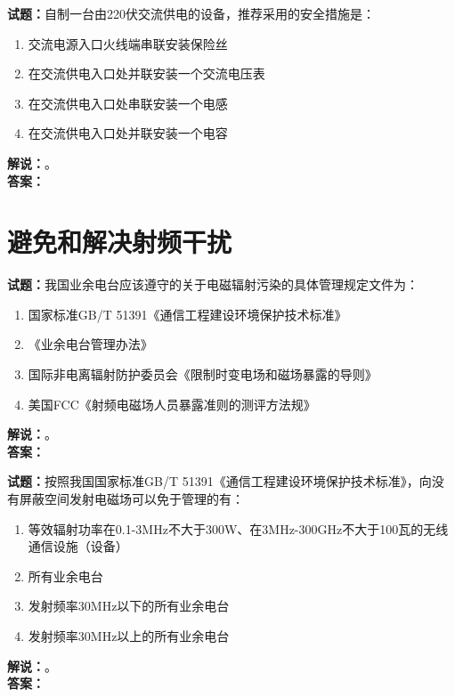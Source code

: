 \documentclass{ctexbook}
\begin{document}
\bigskip

\noindent\textbf{试题：}自制一台由220伏交流供电的设备，推荐采用的安全措施是：
\begin{enumerate}[leftmargin=3em]
  \item 交流电源入口火线端串联安装保险丝
  \item 在交流供电入口处并联安装一个交流电压表
  \item 在交流供电入口处串联安装一个电感
  \item 在交流供电入口处并联安装一个电容
\end{enumerate}
\noindent\textbf{解说：}\textbf{}。\\\noindent\textbf{答案：}

\bigskip

\chapter{避免和解决射频干扰}

\newpage

\noindent\textbf{试题：}我国业余电台应该遵守的关于电磁辐射污染的具体管理规定文件为：
\begin{enumerate}[leftmargin=3em]
  \item 国家标准GB/T 51391《通信工程建设环境保护技术标准》
  \item 《业余电台管理办法》
  \item 国际非电离辐射防护委员会《限制时变电场和磁场暴露的导则》
  \item 美国FCC《射频电磁场人员暴露准则的测评方法规》
\end{enumerate}
\noindent\textbf{解说：}\textbf{}。\\\noindent\textbf{答案：}

\bigskip

\noindent\textbf{试题：}按照我国国家标准GB/T 51391《通信工程建设环境保护技术标准》，向没有屏蔽空间发射电磁场可以免于管理的有：
\begin{enumerate}[leftmargin=3em]
  \item 等效辐射功率在0.1-3\unit{\MHz}不大于300W、在3\unit{\MHz}-300\unit{\GHz}不大于100瓦的无线通信设施（设备）
  \item 所有业余电台
  \item 发射频率30\unit{\MHz}以下的所有业余电台
  \item 发射频率30\unit{\MHz}以上的所有业余电台
\end{enumerate}
\noindent\textbf{解说：}\textbf{}。
\\\noindent\textbf{答案：}
\end{document}
